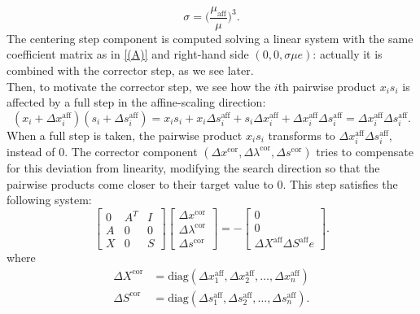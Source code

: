 \documentclass[a4paper,10 pt,titlepage,twoside]{book}
\theoremstyle{plain}
\theoremstyle{definition}
\theoremstyle{remark}
\begin{document}
\begin{equation*}
\sigma = \bigg(\frac{\mu_{\text{aff}}}{\mu}\bigg)^{3}.
\end{equation*}
The centering step component is computed solving a linear system with the same coefficient matrix as in \ref{(A)} and right-hand side $(0, 0,\sigma\mu e)$: actually it is combined with the corrector step, as we see later.\\
Then, to motivate the corrector step, we see how the $i$th pairwise product $x_{i}s_{i}$ is affected by a full step in the affine-scaling direction:
\begin{equation*}
(x_{i}+\Delta x_{i}^{\text{aff}})(s_{i}+\Delta s_{i}^{\text{aff}})= x_{i}s_{i}+ x_{i}\Delta s_{i}^{\text{aff}}+s_{i}\Delta x_{i}^{\text{aff}}+\Delta x_{i}^{\text{aff}}\Delta s_{i}^{\text{aff}} =\Delta x_{i}^{\text{aff}}\Delta s_{i}^{\text{aff}}.
\end{equation*}
When a full step is taken, the pairwise product $x_{i}s_{i}$ transforms to $\Delta x_{i}^{\text{aff}}\Delta s_{i}^{\text{aff}}$, instead of 0. The corrector component $(\Delta x^{\text{cor}}, \Delta \lambda^{\text{cor}}, \Delta s^{\text{cor}})$ tries to compensate for this deviation from linearity, modifying the search direction so that the pairwise products come closer to their target value to 0. This step satisfies the following system:
\begin{equation}\label{(B)}
\begin{bmatrix}
0&A^{T}&I \\A&0&0\\X&0&S
\end{bmatrix}\begin{bmatrix}
\Delta x^{\text{cor}}\\\Delta\lambda^{\text{cor}} \\\Delta s^{\text{cor}}
\end{bmatrix}=-\begin{bmatrix}
0\\0\\\Delta X^{\text{aff}}\Delta S^{\text{aff}}e
\end{bmatrix}.
\end{equation}
where
\begin{align*}
\Delta X^{\text{cor}}& = \text{diag}(\Delta x_{1}^{\text{aff}}, \Delta x_{2}^{\text{aff}},\dots,\Delta x_{n}^{\text{aff}})\\
\Delta S^{\text{cor}}& = \text{diag}(\Delta s_{1}^{\text{aff}}, \Delta s_{2}^{\text{aff}},\dots,\Delta s_{n}^{\text{aff}}).
\end{align*}
\end{document}
